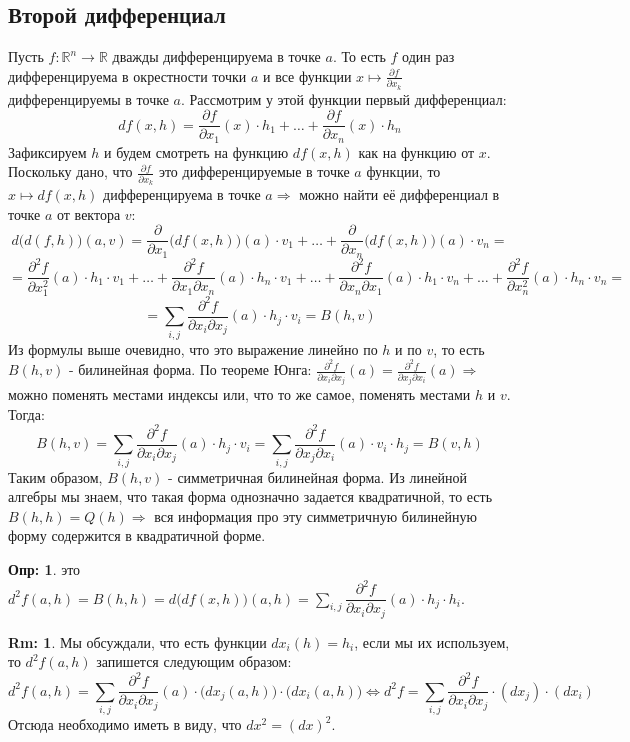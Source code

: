 \documentclass[12pt]{article}
\newcommand{\MR}{\mathbb{R}}
\theoremstyle{definition}
\newtheorem{defn}{Опр:}
\newtheorem{rem}{Rm:}
\begin{document}
\subsection*{Второй дифференциал}
Пусть $f \colon \MR^n \to \MR$ дважды дифференцируема в точке $a$. То есть $f$ один раз дифференцируема в окрестности точки $a$ и все функции $x \mapsto \tfrac{\partial f}{\partial x_k}$ дифференцируемы в точке $a$. Рассмотрим у этой функции первый дифференциал:
$$
	df(x,h) = \dfrac{\partial f}{\partial x_1}(x){\cdot}h_1 + \dotsc + \dfrac{\partial f}{\partial x_n}(x){\cdot}h_n
$$
Зафиксируем $h$ и будем смотреть на функцию $df(x,h)$ как на функцию от $x$. Поскольку дано, что $\tfrac{\partial f}{\partial x_k}$ это дифференцируемые в точке $a$ функции, то $x \mapsto df(x,h)$ дифференцируема в точке $a \Rightarrow$ можно найти её дифференциал в точке $a$ от вектора $v$:
$$
	d\big(d(f,h)\big)(a,v) = \dfrac{\partial}{\partial x_1}\big(df(x,h)\big)(a){\cdot}v_1 + \dotsc + \dfrac{\partial}{\partial x_n}\big(df(x,h)\big)(a){\cdot}v_n = 
$$
$$
	= \dfrac{\partial^2 f}{\partial x_1^2}(a){\cdot}h_1{\cdot}v_1 + \dotsc + \dfrac{\partial^2 f}{\partial x_1 \partial x_n}(a){\cdot}h_n{\cdot}v_1 + \dotsc + \dfrac{\partial^2 f}{\partial x_n \partial x_1}(a){\cdot}h_1{\cdot}v_n + \dotsc + \dfrac{\partial^2 f}{\partial x_n^2}(a){\cdot}h_n{\cdot}v_n =
$$
$$
	= \displaystyle \sum\limits_{i,j}\dfrac{\partial^2 f}{\partial x_i \partial x_j}(a){\cdot}h_j{\cdot}v_i = B(h,v)
$$
Из формулы выше очевидно, что это выражение линейно по $h$ и по $v$, то есть $B(h,v)$ - билинейная форма. По теореме Юнга: $\tfrac{\partial^2 f}{\partial x_i \partial x_j}(a) = \tfrac{\partial^2 f}{\partial x_j \partial x_i}(a)\Rightarrow$ можно поменять местами индексы или, что то же самое, поменять местами $h$ и $v$. Тогда:
$$
	B(h,v) =\displaystyle \sum\limits_{i,j}\dfrac{\partial^2 f}{\partial x_i \partial x_j}(a){\cdot}h_j{\cdot}v_i = \displaystyle \sum\limits_{i,j}\dfrac{\partial^2 f}{\partial x_j \partial x_i}(a){\cdot}v_i{\cdot}h_j = B(v,h)
$$
Таким образом, $B(h,v)$ - симметричная билинейная форма. Из линейной алгебры мы знаем, что такая форма однозначно задается квадратичной, то есть $B(h,h) = Q(h) \Rightarrow$ вся информация про эту симметричную билинейную форму содержится в квадратичной форме.
\begin{defn}
	 это $d^2f(a,h) = B(h,h) = d\big(df(x,h)\big)(a,h) = \displaystyle \sum\limits_{i,j}\dfrac{\partial^2 f}{\partial x_i \partial x_j}(a){\cdot}h_j{\cdot}h_i$.
\end{defn} 
\begin{rem}
	Мы обсуждали, что есть функции $dx_i(h) = h_i$, если мы их используем, то $d^2f(a,h)$ запишется следующим образом:
	$$
		d^2f(a,h) = \displaystyle \sum\limits_{i,j}\dfrac{\partial^2 f}{\partial x_i \partial x_j}(a){\cdot}\big(dx_j(a,h)\big){\cdot}\big(dx_i(a,h)\big) \Leftrightarrow d^2f = \displaystyle \sum\limits_{i,j}\dfrac{\partial^2 f}{\partial x_i \partial x_j}{\cdot}(dx_j){\cdot}(dx_i)
	$$
	Отсюда необходимо иметь в виду, что $dx^2 = (dx)^2$.
\end{rem}
\end{document}
